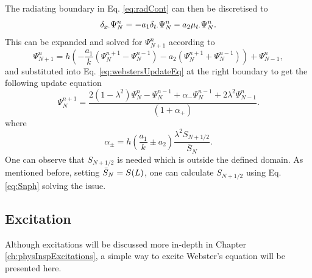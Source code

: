 The radiating boundary in Eq. \eqref{eq:radCont} can then be discretised to \cite{theBible}
\begin{equation}\label{eq:centRadBound}
    \delta_{x\cdot}\Psi_N^n = -a_1\delta_{t\cdot}\Psi_N^n - a_2\mu_{t\cdot}\Psi_N^n.
\end{equation}
This can be expanded and solved for $\Psi_{N+1}^n$ according to
\begin{equation}
    \Psi_{N+1}^n = h\left(-\frac{a_1}{k}(\Psi_N^{n+1} - \Psi_N^{n-1}) - a_2(\Psi_N^{n+1} + \Psi_N^{n-1})\right) + \Psi_{N-1}^n,
\end{equation}
and substituted into Eq. \eqref{eq:webstersUpdateEq} at the right boundary to get the following update equation
\begin{equation}
    \Psi_N^{n+1} = \frac{2(1-\lambda^2)\Psi_N^n-\Psi_N^{n-1}+\alpha_-\Psi_N^{n-1} + 2\lambda^2\Psi_{N-1}^n}{\left(1+\alpha_+\right)}.
\end{equation}
where
\begin{equation}
    \alpha_\pm = h\left(\frac{a_1}{k}\pm a_2\right)\frac{\lambda^2S_{N+1/2}}{\bar S_N}.
\end{equation}
One can observe that $S_{N+1/2}$ is needed which is outside the defined domain. As mentioned before, setting $\bar{S}_N = S(L)$, one can calculate $S_{N+1/2}$ using Eq. \eqref{eq:Snph} solving the issue. 


\subsection{Excitation}
Although excitations will be discussed more in-depth in Chapter \ref{ch:physInspExcitations}, a simple way to excite Webster's equation will be presented here.

